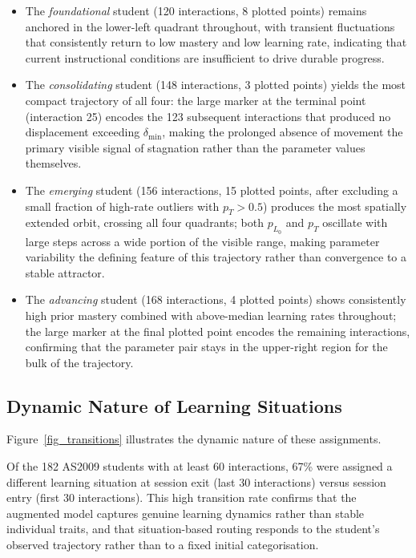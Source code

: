 \documentclass[runningheads]{llncs}
\begin{document}
\begin{itemize}
\item The \textit{foundational} student (120 interactions, 8 plotted points) remains anchored in the lower-left quadrant throughout, with transient fluctuations that consistently return to low mastery and low learning rate, indicating that current instructional conditions are insufficient to drive durable progress.
\item The \textit{consolidating} student (148 interactions, 3 plotted points) yields the most compact trajectory of all four: the large marker at the terminal point (interaction 25) encodes the 123 subsequent interactions that produced no displacement exceeding $\delta_{\min}$, making the prolonged absence of movement the primary visible signal of stagnation rather than the parameter values themselves.
\item The \textit{emerging} student (156 interactions, 15 plotted points, after excluding a small fraction of high-rate outliers with $p_T > 0.5$) produces the most spatially extended orbit, crossing all four quadrants; both $p_{L_0}$ and $p_T$ oscillate with large steps across a wide portion of the visible range, making parameter variability the defining feature of this trajectory rather than convergence to a stable attractor.
\item The \textit{advancing} student (168 interactions, 4 plotted points) shows consistently high prior mastery combined with above-median learning rates throughout; the large marker at the final plotted point encodes the remaining interactions, confirming that the parameter pair stays in the upper-right region for the bulk of the trajectory. 
\end{itemize}

\subsection{Dynamic Nature of Learning Situations}

Figure~\ref{fig_transitions} illustrates the dynamic nature of these assignments. 

Of the 182 AS2009 students with at least 60 interactions, 67\% were assigned a different learning situation at session exit (last 30 interactions) versus session entry (first 30 interactions). This high transition rate confirms that the augmented model captures genuine learning dynamics rather than stable individual traits, and that situation-based routing responds to the student's observed trajectory rather than to a fixed initial categorisation.
\end{document}
